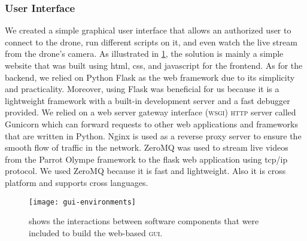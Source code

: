 \documentclass[../main.tex]{subfiles}
\begin{document}
\subsubsection{User Interface}

We created a simple graphical user interface that allows an authorized user 
to connect to the drone, run different scripts on it, and even watch the live 
stream from the drone's camera. 
As illustrated in \cref{fig:gui-environments}, the solution is mainly a simple 
website that was built using html, css, and javascript for the frontend. As 
for the backend, we relied on Python Flask as the web framework due to 
its simplicity and practicality. Moreover, using Flask was beneficial for us 
because it is a lightweight framework with a built-in development server and a 
fast debugger provided. 
We relied on a web server gateway interface (\textsc{wsgi}) \textsc{http} 
server called Gunicorn which can forward requests to other web applications 
and frameworks that are written in Python.
Nginx is used as a reverse proxy server to ensure the smooth flow 
of traffic in the network. ZeroMQ was used to stream live videos from the 
Parrot Olympe framework to the flask web application using tcp/ip protocol. 
We used ZeroMQ because it is fast and lightweight. Also it is cross platform
and supports cross languages.

\begin{figure}[tbp] 
	\centering
	\texttt{[image: gui-environments]} 
	\caption{shows the interactions between software components that were included to 
		build the web-based \textsc{gui}.}
	\label{fig:gui-environments}  
\end{figure}
\end{document}
